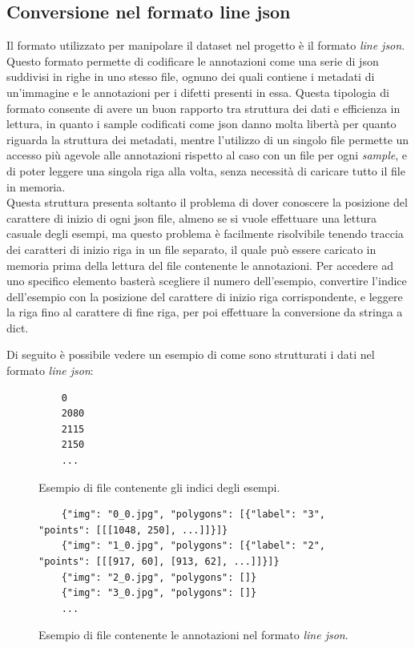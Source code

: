 \subsection{Conversione nel formato line json}
Il formato utilizzato per manipolare il dataset nel progetto è il formato \textit{line json}.
Questo formato permette di codificare le annotazioni come una serie di json suddivisi in righe in uno stesso file,
ognuno dei quali contiene i metadati di un'immagine e le annotazioni per i difetti presenti in essa.
Questa tipologia di formato consente di avere un buon rapporto tra struttura dei dati e efficienza in lettura,
in quanto i sample codificati come json danno molta libertà per quanto riguarda la struttura dei metadati, 
mentre l'utilizzo di un singolo file permette un accesso più agevole alle annotazioni rispetto al caso con un file per ogni \textit{sample}, 
e di poter leggere una singola riga alla volta, senza necessità di caricare tutto il file in memoria.\\
Questa struttura presenta soltanto il problema di dover conoscere la posizione del carattere di inizio di ogni json file,
almeno se si vuole effettuare una lettura casuale degli esempi, ma questo problema è facilmente risolvibile tenendo traccia dei caratteri di
inizio riga in un file separato, il quale può essere caricato in memoria prima della lettura del file contenente le annotazioni.
Per accedere ad uno specifico elemento basterà scegliere il numero dell'esempio, convertire l'indice dell'esempio con la posizione del carattere
di inizio riga corrispondente, e leggere la riga fino al carattere di fine riga, per poi effettuare la conversione da stringa a dict.

Di seguito è possibile vedere un esempio di come sono strutturati i dati nel formato \textit{line json}:

\begin{figure}[H]
    \begin{verbatim}
    0
    2080
    2115
    2150
    ...
    \end{verbatim}
    \caption{Esempio di file contenente gli indici degli esempi.}
\end{figure}

\begin{figure}[H]
    \begin{verbatim}
    {"img": "0_0.jpg", "polygons": [{"label": "3", "points": [[[1048, 250], ...]]}]}
    {"img": "1_0.jpg", "polygons": [{"label": "2", "points": [[[917, 60], [913, 62], ...]]}]}
    {"img": "2_0.jpg", "polygons": []}
    {"img": "3_0.jpg", "polygons": []}
    ...
    \end{verbatim}
    \caption{Esempio di file contenente le annotazioni nel formato \textit{line json}.}
\end{figure}


